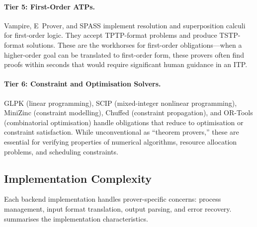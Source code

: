 \documentclass[11pt,a4paper]{article}
\begin{document}
\paragraph{Tier 5: First-Order ATPs.}
Vampire, E~Prover, and SPASS implement resolution and superposition calculi
for first-order logic. They accept TPTP-format problems and produce TSTP-format
solutions. These are the workhorses for first-order obligations---when a
higher-order goal can be translated to first-order form, these provers
often find proofs within seconds that would require significant human guidance
in an ITP.

\paragraph{Tier 6: Constraint and Optimisation Solvers.}
GLPK (linear programming), SCIP (mixed-integer nonlinear programming),
MiniZinc (constraint modelling), Chuffed (constraint propagation), and
OR-Tools (combinatorial optimisation) handle obligations that reduce to
optimisation or constraint satisfaction. While unconventional as ``theorem
provers,'' these are essential for verifying properties of numerical algorithms,
resource allocation problems, and scheduling constraints.

\subsection{Implementation Complexity}

Each backend implementation handles prover-specific concerns: process
management, input format translation, output parsing, and error recovery.
 summarises the implementation characteristics.
\end{document}
